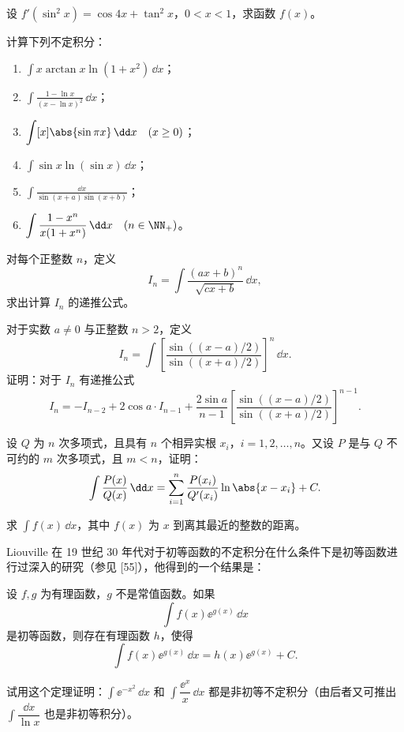 \begin{xreferenceproblem}[1]
设 $f'(\sin^2x)=\cos4x+\tan^2x$，$0<x<1$，求函数 $f(x)$。
\end{xreferenceproblem}

\begin{xreferenceproblem}[2]
计算下列不定积分：
  \begin{enumerate}[label=(\arabic*)]
    \item $\displaystyle\int x\arctan x\ln(1+x^2)\,\dd x$；
    \item $\displaystyle\int\frac{1-\ln x}{(x-\ln x)^2}\,\dd x$；
    \item $\displaystyle\int [x]\abs{\sin\pi x}\,\dd x\quad(x\ge0)$；
    \item $\displaystyle\int\sin x\ln(\sin x)\,\dd x$；
    \item $\displaystyle\int\frac{\dd x}{\sin(x+a)\sin(x+b)}$；
    \item $\displaystyle\int\frac{1-x^n}{x(1+x^n)}\,\dd x\quad(n\in\NN_+)$。
  \end{enumerate}
\end{xreferenceproblem}

\begin{xreferenceproblem}[3]
对每个正整数 $n$，定义
  \[
    I_n=\int\frac{(ax+b)^n}{\sqrt{cx+b}}\,\dd x,
  \]
  求出计算 $I_n$ 的递推公式。
\end{xreferenceproblem}

\begin{xreferenceproblem}[4]
对于实数 $a\ne0$ 与正整数 $n>2$，定义
  \[
    I_n=\int\left[\frac{\sin((x-a)/2)}{\sin((x+a)/2)}\right]^n\,\dd x.
  \]
  证明：对于 $I_n$ 有递推公式
  \[
    I_n=-I_{n-2}+2\cos a\cdot I_{n-1}
      +\frac{2\sin a}{n-1}
      \left[\frac{\sin((x-a)/2)}{\sin((x+a)/2)}\right]^{n-1}.
  \]
\end{xreferenceproblem}

\begin{xreferenceproblem}[5]
设 $Q$ 为 $n$ 次多项式，且具有 $n$ 个相异实根 $x_i$，$i=1,2,\ldots,n$。又设 $P$ 是与 $Q$ 不可约的 $m$ 次多项式，且 $m<n$，证明：
  \[
    \int\frac{P(x)}{Q(x)}\,\dd x
    =\sum_{i=1}^n\frac{P(x_i)}{Q'(x_i)}\ln\abs{x-x_i}+C.
  \]
\end{xreferenceproblem}

\begin{xreferenceproblem}[6]
求 $\int f(x)\,\dd x$，其中 $f(x)$ 为 $x$ 到离其最近的整数的距离。
\end{xreferenceproblem}

\begin{xreferenceproblem}[7]
Liouville 在 19 世纪 30 年代对于初等函数的不定积分在什么条件下是初等函数进行过深入的研究（参见 [55]），他得到的一个结果是：

  \begin{xtheorem}
  设 $f,g$ 为有理函数，$g$ 不是常值函数。如果
  \[
    \int f(x)\ee^{g(x)}\,\dd x
  \]
  是初等函数，则存在有理函数 $h$，使得
  \[
    \int f(x)\ee^{g(x)}\,\dd x=h(x)\ee^{g(x)}+C.
  \]
  \end{xtheorem}

  试用这个定理证明：$\int\ee^{-x^2}\,\dd x$ 和 $\int\dfrac{\ee^x}{x}\,\dd x$ 都是非初等不定积分（由后者又可推出 $\int\dfrac{\dd x}{\ln x}$ 也是非初等积分）。
\end{xreferenceproblem}

